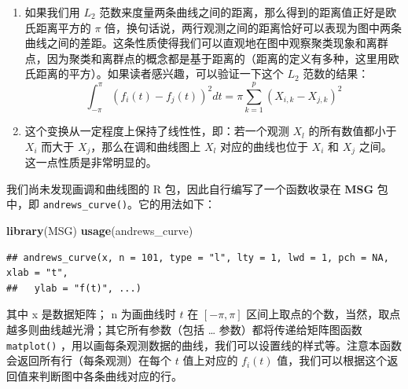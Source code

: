 \documentclass[
  b5paper,
  UTF8,twoside]{book}
\newenvironment{Shaded}{\begin{snugshade}}{\end{snugshade}}
\newcommand{\FunctionTok}[1]{\textcolor[rgb]{0.13,0.29,0.53}{\textbf{#1}}}
\newcommand{\NormalTok}[1]{#1}
\begin{document}
\begin{enumerate}
\def\labelenumi{\arabic{enumi}.}
\item
  如果我们用 \(L_{2}\) 范数来度量两条曲线之间的距离，那么得到的距离值正好是欧氏距离平方的 \(\pi\) 倍，换句话说，两行观测之间的距离恰好可以表现为图中两条曲线之间的差距。这条性质使得我们可以直观地在图中观察聚类现象和离群点，因为聚类和离群点的概念都是基于距离的（距离的定义有多种，这里用欧氏距离的平方）。如果读者感兴趣，可以验证一下这个 \(L_{2}\) 范数的结果：
  \[\int_{-\pi}^{\pi}\left(f_{i}(t)-f_{j}(t)\right)^{2}dt=\pi\sum_{k=1}^{p}\left(X_{i,k}-X_{j,k}\right)^{2}\]
\item
  这个变换从一定程度上保持了线性性，即：若一个观测 \(X_{l}\) 的所有数值都小于 \(X_{i}\) 而大于 \(X_{j}\)，那么在调和曲线图上 \(X_{l}\) 对应的曲线也位于 \(X_{i}\) 和 \(X_{j}\) 之间。这一点性质是非常明显的。
\end{enumerate}

我们尚未发现画调和曲线图的 R 包，因此自行编写了一个函数收录在 \textbf{MSG} 包 \citep{MSG} 中，即 \texttt{andrews\_curve()}。它的用法如下：

\begin{Shaded}
\begin{Highlighting}[]
\FunctionTok{library}\NormalTok{(MSG)}
\FunctionTok{usage}\NormalTok{(andrews\_curve)}
\end{Highlighting}
\end{Shaded}

\begin{verbatim}
## andrews_curve(x, n = 101, type = "l", lty = 1, lwd = 1, pch = NA, xlab = "t",
##   ylab = "f(t)", ...)
\end{verbatim}

其中 x 是数据矩阵； n 为画曲线时 \(t\) 在 \([-\pi,\pi]\) 区间上取点的个数，当然，取点越多则曲线越光滑；其它所有参数（包括 \ldots{} 参数）都将传递给矩阵图函数 \texttt{matplot()} ，用以画每条观测数据的曲线，我们可以设置线的样式等。注意本函数会返回所有行（每条观测）在每个 \(t\) 值上对应的 \(f_{i}(t)\) 值，我们可以根据这个返回值来判断图中各条曲线对应的行。
\end{document}
